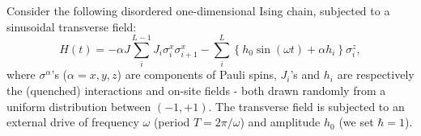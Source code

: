\documentclass[reprint,preprintnumbers,showpacs,amsmath,twocolumn,showkeys,aps,prl]{revtex4-1}
\begin{document}
\noindent
Consider the following disordered one-dimensional Ising chain, subjected to a 
sinusoidal transverse field: 
\begin{equation}
H(t) = -\alpha J \sum_{i}^{L-1} J_i \sigma^{x}_{i}\sigma^{x}_{i+1}  
-\sum_{i}^{L} \left\{h_{0}\sin{(\omega t)} + \alpha h_i\right\} \sigma^{z}_{i}, 
\label{H_OBC}
\end{equation}
\noindent where $\sigma^{\alpha}$'s ($\alpha = x,y,z$) are components of Pauli spins, $J_{i}$'s and 
$h_{i}$ are respectively the (quenched) interactions and on-site fields - both drawn randomly 
from a uniform distribution between $\left(-1,+1\right).$
The transverse field is subjected to an external  drive of frequency $\omega$ (period $T = 2\pi/\omega$) 
and amplitude $h_{0}$ (we set $\hbar = 1$).  
\end{document}
